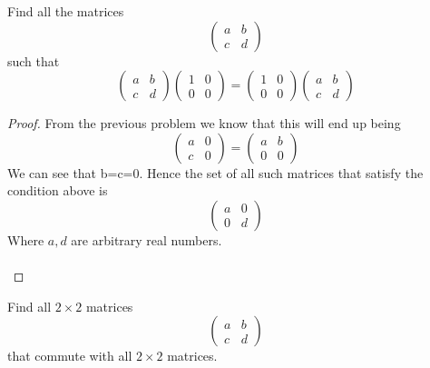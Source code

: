 \documentclass[12pt]{article}
\newenvironment{problem}[2][Problem]{\begin{trivlist}
\item[\hskip \labelsep {\bfseries #1}\hskip \labelsep {\bfseries #2.}]}{\end{trivlist}}
\begin{document}
\begin{problem}{4.1.8}
Find all the matrices $$\begin{pmatrix}
	a & b\\
	c & d
	\end{pmatrix}
	$$
	such that 
	$$\begin{pmatrix}
	a & b\\
	c & d
	\end{pmatrix}
	\begin{pmatrix}
	1 & 0\\
	0 & 0
	\end{pmatrix}
	=
	\begin{pmatrix}
	1 & 0\\
	0 & 0
	\end{pmatrix}
	\begin{pmatrix}
	a & b\\
	c & d
	\end{pmatrix}
	$$
\end{problem}

\begin{proof} 
From the previous problem we know that this will end up being 
$$\begin{pmatrix}
	a & 0\\
	c & 0
	\end{pmatrix}
	=
	\begin{pmatrix}
	a & b\\
	0 & 0
	\end{pmatrix}
	$$
	We can see that b=c=0. Hence the set of all such matrices that satisfy the condition above is 
	$$\begin{pmatrix}
	a & 0\\
	0 & d
	\end{pmatrix}
	$$
	Where $a,d$ are arbitrary real numbers. \\ \\
\end{proof}

\begin{problem}{4.1.9}
Find all $2 \times 2$ matrices 
$$ \begin{pmatrix}
a &b \\
c &d 
\end{pmatrix}
$$ 
that commute with all $2 \times 2$ matrices. \\ \\
\end{problem}
\end{document}
